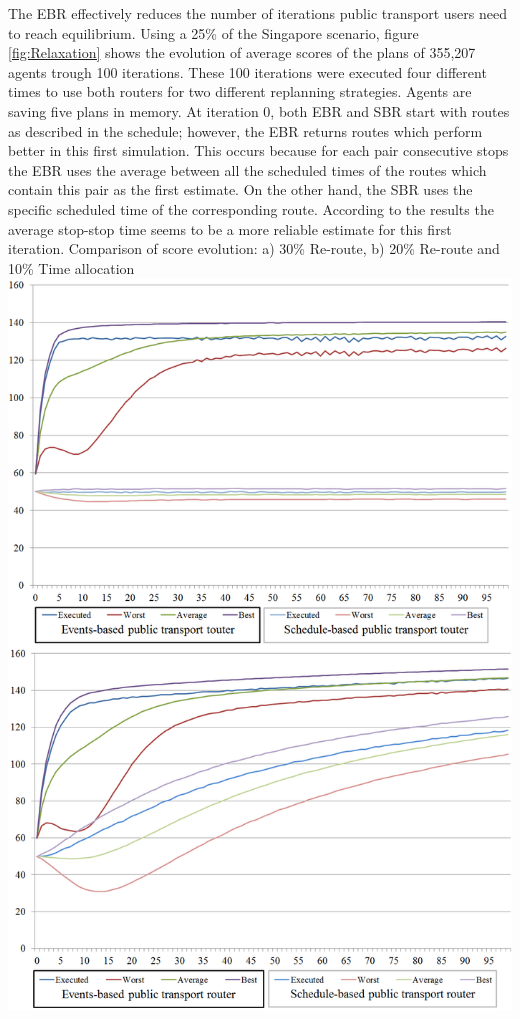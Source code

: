 The EBR effectively reduces the number of iterations public transport users need to reach equilibrium. Using a 25\% of the Singapore scenario, figure \ref{fig:Relaxation} shows the evolution of average scores of the plans of 355,207 agents trough 100 iterations. These 100 iterations were executed four different times to use both routers for two different replanning strategies. Agents are saving five plans in memory. At iteration 0, both EBR and SBR start with routes as described in the schedule; however, the EBR returns routes which perform better in this first simulation. This occurs because for each pair consecutive stops the EBR uses the average between all the scheduled times of the routes which contain this pair as the first estimate. On the other hand, the SBR uses the specific scheduled time of the corresponding route. According to the results the average stop-stop time seems to be a more reliable estimate for this first iteration.
\createfigure
{}
{Comparison of score evolution: a) 30\% Re-route, b) 20\% Re-route and 10\% Time allocation}
{\label{fig:Relaxation}}
{\includegraphics[width=1.0\textwidth]{extending/figures/ebr/Relaxation.png}}
{}

